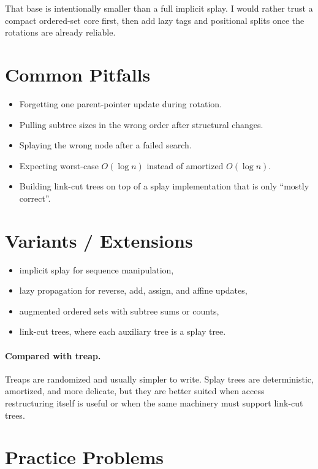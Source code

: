 That base is intentionally smaller than a full implicit splay. I would rather trust a compact ordered-set core first,
then add lazy tags and positional splits once the rotations are already reliable.

\section*{Common Pitfalls}

\begin{itemize}
  \item Forgetting one parent-pointer update during rotation.
  \item Pulling subtree sizes in the wrong order after structural changes.
  \item Splaying the wrong node after a failed search.
  \item Expecting worst-case \(O(\log n)\) instead of amortized \(O(\log n)\).
  \item Building link-cut trees on top of a splay implementation that is only ``mostly correct''.
\end{itemize}

\section*{Variants / Extensions}

\begin{itemize}
  \item implicit splay for sequence manipulation,
  \item lazy propagation for reverse, add, assign, and affine updates,
  \item augmented ordered sets with subtree sums or counts,
  \item link-cut trees, where each auxiliary tree is a splay tree.
\end{itemize}

\paragraph{Compared with treap.}
Treaps are randomized and usually simpler to write. Splay trees are deterministic, amortized, and more delicate, but
they are better suited when access restructuring itself is useful or when the same machinery must support link-cut
trees.

\section*{Practice Problems}

